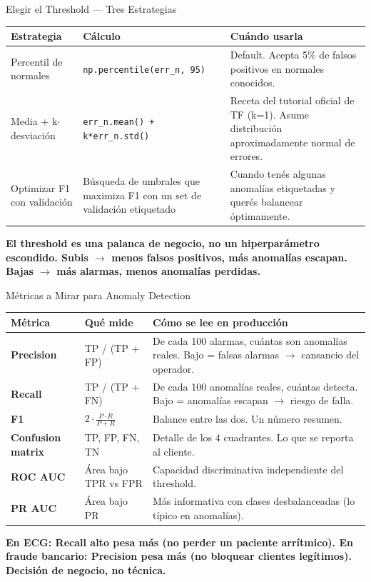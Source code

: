 \documentclass[aspectratio=169, 11pt]{beamer}
\begin{document}
\begin{frame}[shrink]{Elegir el Threshold --- Tres Estrategias}
  \vspace{6pt}
  {\footnotesize
  \begin{tabular}{@{}p{3.8cm} p{4.2cm} p{5.5cm}@{}}
    \toprule
    \rowcolor{arcaLightGray}
    \textbf{Estrategia} & \textbf{Cálculo} & \textbf{Cuándo usarla} \\
    \midrule
    Percentil de normales & \texttt{np.percentile(err\_n, 95)} & Default. Acepta 5\% de falsos positivos en normales conocidos. \\
    Media + k$\cdot$desviación & \texttt{err\_n.mean() + k*err\_n.std()} & Receta del tutorial oficial de TF (k=1). Asume distribución aproximadamente normal de errores. \\
    Optimizar F1 con validación & Búsqueda de umbrales que maximiza F1 con un set de validación etiquetado & Cuando tenés algunas anomalías etiquetadas y querés balancear óptimamente. \\
    \bottomrule
  \end{tabular}}
  \vspace{12pt}
  {\footnotesize\color{arcaDark}\bfseries
  El threshold es una \textbf{palanca de negocio}, no un hiperparámetro escondido. Subis $\to$ menos falsos positivos, más anomalías escapan. Bajas $\to$ más alarmas, menos anomalías perdidas.}
\end{frame}

\begin{frame}[shrink]{Métricas a Mirar para Anomaly Detection}
  \vspace{6pt}
  {\footnotesize
  \begin{tabular}{@{}p{3.0cm} p{4.0cm} p{6.5cm}@{}}
    \toprule
    \rowcolor{arcaLightGray}
    \textbf{Métrica} & \textbf{Qué mide} & \textbf{Cómo se lee en producción} \\
    \midrule
    \textbf{Precision} & TP / (TP + FP) & De cada 100 alarmas, cuántas son anomalías reales. Bajo = falsas alarmas $\to$ cansancio del operador. \\
    \textbf{Recall} & TP / (TP + FN) & De cada 100 anomalías reales, cuántas detecta. Bajo = anomalías escapan $\to$ riesgo de falla. \\
    \textbf{F1} & $2 \cdot \frac{P \cdot R}{P + R}$ & Balance entre las dos. Un número resumen. \\
    \textbf{Confusion matrix} & TP, FP, FN, TN & Detalle de los 4 cuadrantes. Lo que se reporta al cliente. \\
    \textbf{ROC AUC} & Área bajo TPR vs FPR & Capacidad discriminativa independiente del threshold. \\
    \textbf{PR AUC} & Área bajo PR & Más informativa con clases desbalanceadas (lo típico en anomalías). \\
    \bottomrule
  \end{tabular}}
  \vspace{8pt}
  {\footnotesize\color{arcaDark}\bfseries
  En ECG: Recall alto pesa más (no perder un paciente arrítmico). En fraude bancario: Precision pesa más (no bloquear clientes legítimos). Decisión de negocio, no técnica.}
\end{frame}
\end{document}
